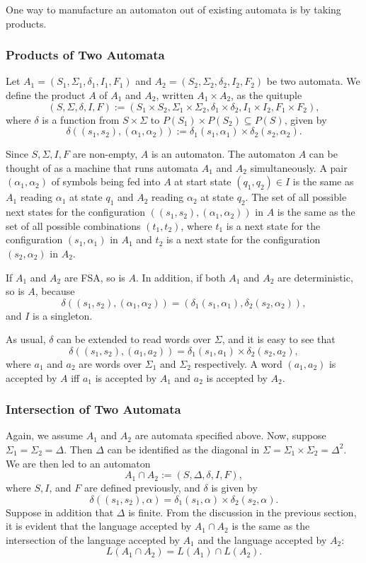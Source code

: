 \documentclass[12pt]{article}
\begin{document}
One way to manufacture an automaton out of existing automata is by taking products.

\subsubsection*{Products of Two Automata}

Let $A_1=(S_1,\Sigma_1,\delta_1,I_1,F_1)$ and $A_2=(S_2,\Sigma_2,\delta_2,I_2,F_2)$ be two automata.  We define the product $A$ of $A_1$ and $A_2$, written $A_1\times A_2$, as the quituple 
$$(S,\Sigma,\delta,I,F):=(S_1\times S_2,\Sigma_1\times \Sigma_2,\delta_1\times \delta_2, I_1\times I_2, F_1\times F_2),$$
where $\delta$ is a function from $S\times \Sigma$ to $P(S_1)\times P(S_2)\subseteq P(S)$, given by $$\delta((s_1,s_2),(\alpha_1,\alpha_2)):=\delta_1(s_1,\alpha_1)\times \delta_2(s_2,\alpha_2).$$

Since $S,\Sigma,I,F$ are non-empty, $A$ is an automaton.  The automaton $A$ can be thought of as a machine that runs automata $A_1$ and $A_2$ simultaneously.  A pair $(\alpha_1,\alpha_2)$ of symbols being fed into $A$ at start state $(q_1,q_2)\in I$ is the same as $A_1$ reading $\alpha_1$ at state $q_1$ and $A_2$ reading $\alpha_2$ at state $q_2$.  The set of all possible next states for the configuration $((s_1,s_2),(\alpha_1,\alpha_2))$ in $A$ is the same as the set of all possible combinations $(t_1,t_2)$, where $t_1$ is a next state for the configuration $(s_1,\alpha_1)$ in $A_1$ and $t_2$ is a next state for the configuration $(s_2,\alpha_2)$ in $A_2$.

If $A_1$ and $A_2$ are FSA, so is $A$.  In addition, if both $A_1$ and $A_2$ are deterministic, so is $A$, because $$\delta((s_1,s_2),(\alpha_1,\alpha_2))=(\delta_1(s_1,\alpha_1),\delta_2(s_2, \alpha_2)),$$ and $I$ is a singleton.

As usual, $\delta$ can be extended to read words over $\Sigma$, and it is easy to see that  $$\delta((s_1,s_2),(a_1,a_2))=\delta_1(s_1,a_1)\times \delta_2(s_2,a_2),$$ where $a_1$ and $a_2$ are words over $\Sigma_1$ and $\Sigma_2$ respectively.  A word $(a_1,a_2)$ is accepted by $A$ iff $a_1$ is accepted by $A_1$ and $a_2$ is accepted by $A_2$.

\subsubsection*{Intersection of Two Automata}

Again, we assume $A_1$ and $A_2$ are automata specified above.  Now, suppose $\Sigma_1=\Sigma_2=\Delta$.  Then $\Delta$ can be identified as the diagonal in $\Sigma=\Sigma_1\times \Sigma_2=\Delta^2$.  We are then led to an automaton $$A_1\cap A_2:=(S,\Delta, \delta,I,F),$$ where $S,I$, and $F$ are defined previously, and $\delta$ is given by $$\delta((s_1,s_2),\alpha)=\delta_1(s_1,\alpha)\times \delta_2(s_2,\alpha).$$  
Suppose in addition that $\Delta$ is finite.  From the discussion in the previous section, it is evident that the language accepted by $A_1\cap A_2$ is the same as the intersection of the language accepted by $A_1$ and the language accepted by $A_2$: $$L(A_1\cap A_2) = L(A_1)\cap L(A_2).$$
\end{document}
